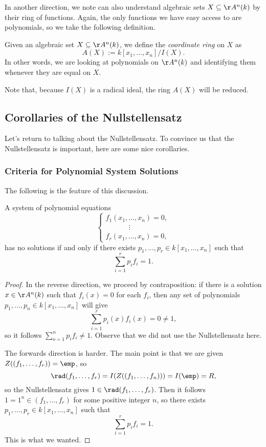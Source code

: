 \documentclass[../notes.tex]{subfiles}
\begin{document}
In another direction, we note can also understand algebraic sets $X\subseteq\AA^n(k)$ by their ring of functions. Again, the only functions we have easy access to are polynomials, so we take the following definition.
\begin{definition}
	Given an algebraic set $X\subseteq\AA^n(k)$, we define the \textit{coordinate ring} on $X$ as
	\[A(X):=k[x_1,\ldots,x_n]/I(X).\]
	In other words, we are looking at polynomials on $\AA^n(k)$ and identifying them whenever they are equal on $X$.
\end{definition}
Note that, because $I(X)$ is a radical ideal, the ring $A(X)$ will be reduced.

\subsection{Corollaries of the Nullstellensatz}
Let's return to talking about the Nullstellensatz. To convince us that the Nullstellensatz is important, here are some nice corollaries.

\subsubsection{Criteria for Polynomial System Solutions}
The following is the feature of this discussion.
\begin{corollary}
	A system of polynomial equations
	\[\begin{cases}
		f_1(x_1,\ldots,x_n) = 0, \\
		\qquad\quad~\vdots \\
		f_r(x_1,\ldots,x_n) = 0,
	\end{cases}\]
	has no solutions if and only if there exists $p_1,\ldots,p_r\in k[x_1,\ldots,x_n]$ such that
	\[\sum_{i=1}^rp_if_i=1.\]
\end{corollary}
\begin{proof}
	In the reverse direction, we proceed by contraposition: if there is a solution $x\in\AA^n(k)$ such that $f_i(x)=0$ for each $f_i$, then any set of polynomials $p_1,\ldots,p_n\in k[x_1,\ldots,x_n]$ will give
	\[\sum_{i=1}^rp_i(x)f_i(x)=0\ne1,\]
	so it follows $\sum_{o=1}^np_if_i\ne1$. Observe that we did not use the Nullstellensatz here.

	The forwards direction is harder. The main point is that we are given $Z((f_1,\ldots,f_r))=\emp$, so
	\[\rad(f_1,\ldots,f_r)=I(Z((f_1,\ldots,f_n)))=I(\emp)=R,\]
	so the Nullstellensatz gives $1\in\rad(f_1,\ldots,f_r)$. Then it follows $1=1^n\in(f_1,\ldots,f_r)$ for some positive integer $n$, so there exists $p_1,\ldots,p_r\in k[x_1,\ldots,x_n]$ such that
	\[\sum_{i=1}^rp_if_i=1.\]
	This is what we wanted.
\end{proof}
\end{document}
